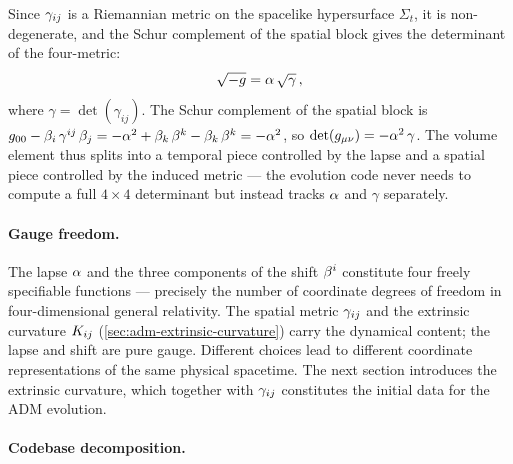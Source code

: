 Since $\gamma_{ij}$ is a Riemannian metric on the spacelike
hypersurface $\Sigma_t$, it is non-degenerate, and the Schur complement
of the spatial block gives the determinant of the four-metric:
%
\begin{equation}
  \sqrt{-g} = \alpha\,\sqrt{\gamma} \,,
  \label{eq:adm-determinant}
\end{equation}
%
where $\gamma = \det(\gamma_{ij})$.  The Schur complement of
the spatial block is $g_{00} - \beta_i\,\gamma^{ij}\,\beta_j
= -\alpha^2 + \beta_k\,\beta^k - \beta_k\,\beta^k = -\alpha^2$, so
$\det(g_{\mu\nu}) = -\alpha^2\,\gamma$.
The volume element thus splits into a temporal piece controlled by the
lapse and a spatial piece controlled by the induced metric ---
the evolution code never needs to compute a full $4 \times 4$
determinant but instead tracks $\alpha$ and $\gamma$ separately.

\paragraph{Gauge freedom.}

The lapse $\alpha$ and the three components of the shift $\beta^{i}$
constitute four freely specifiable functions --- precisely the number
of coordinate degrees of freedom in four-dimensional general relativity.
The spatial metric $\gamma_{ij}$ and the extrinsic curvature
$K_{ij}$ (\cref{sec:adm-extrinsic-curvature}) carry the dynamical
content; the lapse and shift are pure gauge.  Different choices lead to
different coordinate representations of the same physical spacetime.
The next section introduces the extrinsic curvature, which together
with $\gamma_{ij}$ constitutes the initial data for the ADM
evolution.

\paragraph{Codebase decomposition.}

